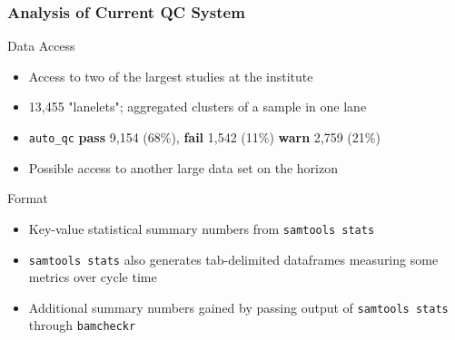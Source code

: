 \documentclass{beamer}
\begin{document}
\begin{frame}[t]
\frametitle{Analysis of Current QC System}
    \begin{beamerboxesrounded}[shadow=true]{}
        \begin{center}
            Data Access
        \end{center}
    \end{beamerboxesrounded}
    \begin{itemize}
        \item Access to two of the largest studies at the institute
        \item 13,455 "lanelets"; aggregated clusters of a sample in one lane
        \item \texttt{auto\_qc} \textbf{pass} 9,154 (68\%), 
            \textbf{fail} 1,542 (11\%) \textbf{warn} 2,759 (21\%)
        \item Possible access to another large data set on the horizon
    \end{itemize}

    \vskip 0.5cm

    \begin{beamerboxesrounded}[shadow=true]{}
        \begin{center}
            Format
        \end{center}
    \end{beamerboxesrounded}
    \begin{itemize}
        \item Key-value statistical summary numbers from \texttt{samtools stats}
        \item \texttt{samtools stats} also generates tab-delimited dataframes 
            measuring some metrics over cycle time
        \item Additional summary numbers gained by passing output of 
            \texttt{samtools stats} through \texttt{bamcheckr}
    \end{itemize}
\end{frame}
\end{document}
